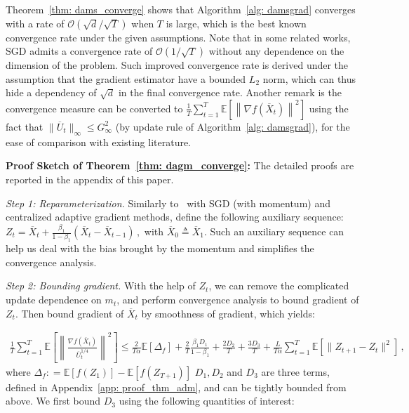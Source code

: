 \documentclass[11pt]{article}
\begin{document}
Theorem~\ref{thm: dams_converge} shows that Algorithm~\ref{alg: damsgrad} converges with a rate of  $\mathcal{O}(\sqrt{d}/\sqrt{T})$ when $T$ is large, which is the best known convergence rate under the given assumptions. 
Note that in some related works, SGD admits a convergence rate of $\mathcal{O}(1/\sqrt{T})$ without any dependence on the dimension of the problem.
Such improved convergence rate is derived under the assumption that the gradient estimator have a bounded $L_2$ norm, which can thus hide a dependency of $\sqrt{d}$ in the final convergence rate. {Another remark is the convergence measure can be converted to $\frac{1}{T}\sum_{t=1}^T  \mathbb E \left [\left\|{\nabla f( \overline X_{t})}\right\|^2  \right]$
using the fact that $\|\overline U_{t}\|_{\infty} \leq G_{\infty}^2$  (by update rule of Algorithm~\ref{alg: damsgrad}), for the ease of comparison with existing literature.}


\newpage


\noindent\textbf{Proof Sketch of Theorem~\ref{thm: dagm_converge}:} The detailed proofs are reported in the appendix of this paper.

\vspace{0.1in}

 
\textsl{Step 1: Reparameterization.} \hspace{0.01in} Similarly to~\cite{yan2018unified, chen2018convergence} with SGD (with momentum) and centralized adaptive gradient methods, define the following auxiliary sequence:
 $
 Z_{t} = \overline X_t + \frac{\beta_1}{1-\beta_1} (\overline X_t - \overline X_{t-1}) \, ,
 $
with $\overline X_{0} \triangleq \overline X_1$.
Such an auxiliary sequence can help us deal with the bias brought by the momentum and simplifies the convergence analysis. 

\vspace{0.1in}
 
 \textsl{Step 2: Bounding gradient.} \hspace{0.01in} With the help of $Z_t$, we can remove the complicated update dependence on $m_t$, and perform convergence analysis to bound gradient of $Z_t$. Then bound gradient of $\overline X_t$ by smoothness of gradient, which yields:
  
 \begin{align} \label{eq: exp_telescope_sketchmain}
 \frac{1}{T}\sum_{t=1}^T  \mathbb E \left [\left\|\frac{\nabla f( \overline X_{t})}{\overline U_{t}^{1/4}}\right\|^2  \right] \leq \frac{2}{T\alpha}  \mathbb E  [\Delta_f] 
 + \frac{2}{T}\frac{\beta_1 D_1}{1-\beta_1} 
  + \frac{2 D_2}{T}  + \frac{3 D_3}{T} + \frac{L}{T\alpha} \sum_{t=1}^T\mathbb E\left[\| Z_{t+1}-  Z_{t}\|^2 \right]\, ,
 \end{align}
where $\Delta_f : = \mathbb E [f( Z_{1})] - \mathbb E [f( Z_{T+1})]$ $D_1, D_2$ and $D_3$ are three terms, defined in Appendix~\ref{app: proof_thm_adm}, and can be tightly bounded from above. 
We first bound $D_3$ using the following quantities of interest:
 
\end{document}
